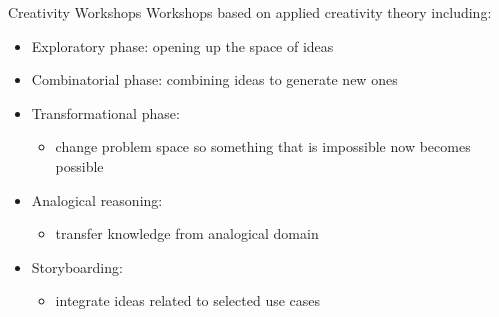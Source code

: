 \begin{Slide}{Creativity Workshops}
Workshops based on applied creativity theory including:
\begin{itemize}
\item Exploratory phase: opening up the space of ideas
\item Combinatorial phase: combining ideas to generate new ones
\item Transformational phase: 
\begin{itemize}
\item change problem space so something that is impossible now becomes possible
\end{itemize}
\item Analogical reasoning: 
\begin{itemize}
\item transfer knowledge from analogical domain
\end{itemize}
\item Storyboarding: 
\begin{itemize}
\item integrate ideas related to selected use cases


\end{itemize}
\end{itemize}
\end{Slide}